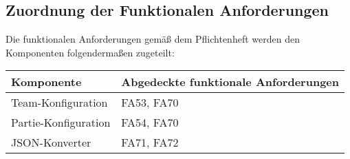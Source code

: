 	\subsection{Zuordnung der Funktionalen Anforderungen}
	
	Die funktionalen Anforderungen gemäß dem Pflichtenheft werden den Komponenten folgendermaßen zugeteilt:

	\begin{table}[h]
	\centering
	\begin{tabular}{|l|l|}
		\hline
		\textbf{Komponente} & \textbf{Abgedeckte funktionale Anforderungen}\\ \hline
		Team-Konfiguration & FA53, FA70 \\ \hline
		
		Partie-Konfiguration & FA54, FA70 \\ \hline
		
		JSON-Konverter & FA71, FA72 \\ \hline

	
	\end{tabular}
	\end{table}